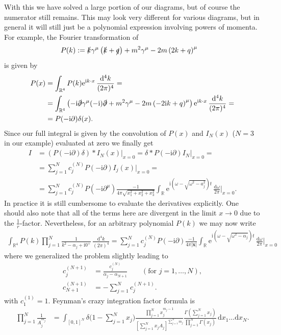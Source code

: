 \documentclass[english, parskip=full]{scrartcl}
\newcommand{\intx}{}
\newcommand{\intr}{}
\newcommand{\kla}{}
\newcommand{\klam}{}
\newcommand{\tecxt}{}
\renewcommand{\i}{\text{i}}
\newcommand{\e}{\text{e}}
\begin{document}
With this we have solved a large portion of our diagrams, but of course the numerator still remains.
This may look very different for various diagrams, but in general it will still just be a polynomial expression involving powers of momenta.
For example, the Fourier transformation of
\begin{align}
P(k) &:= \slashed{k} \gamma^\mu \kla\left( \slashed{k} + \slashed{q} \right) + m^2\gamma^\mu - 2m \kla\left( 2k + q \right)^\mu 
\end{align}
is given by
\begin{align}
P(x) &= \intr\int_{\mathbb{R}^{4}} P(k)\e^{\i k\cdot x} \, \frac{\mathrm{d}^{4}k}{(2\pi)^4} = \\
&= \int_{\mathbb{R}^{4}} \kla\left( -\i\slashed{\partial} \gamma^\mu (-\i) \slashed{\partial} + m^2 \gamma^\mu - 2m \kla\left( -2\i k + q \right)^\mu  \right) \e^{\i k\cdot x} \, \frac{\mathrm{d}^{4}k}{(2\pi)^4} = \\
&= P(-\i\partial) \delta(x).
\end{align}
Since our full integral is given by the convolution of $P(x)$ and $I_N(x)$ ($N=3$ in our example) evaluated at zero we finally get
\begin{align}
I &= \kla\left( P(-\i\partial) \delta \right) \ast I_N(x) \Big\vert_{x=0} = \delta \ast P(-\i\partial) I_N \Big\vert_{x=0} = \\
&= \sum_{j=1}^N c_j^{(N)} P(-\i\partial) I_j(x) \Big\vert_{x=0} = \\
&= \sum_{j=1}^N c_j^{(N)} P(-\i\partial^\mu) \frac{-1}{4\pi \sqrt{x_1^2 + x_2^2 + x_3^2}} \intr\int_{\mathbb{R}^{ }} \e^{\i \kla\left( \omega - \sqrt{\omega^2 - a_j^2} \right) t} \, \frac{\mathrm{d}\omega}{2\pi} \Big\vert_{x=0}.
\end{align}
In practice it is still cumbersome to evaluate the derivatives explicitly. 
One should also note that all of the terms here are divergent in the limit $x\rightarrow 0$ due to the $\frac{1}{r}$-factor.
Nevertheless, for an arbitrary polynomial $P(k)$ we may now write
\begin{align}
\intr\int_{\mathbb{R}^{4}} P(k) \prod_{j=1}^N \frac{1}{k^2 - \alpha_j + \i 0^+} \, \frac{\mathrm{d}^{4}k}{(2\pi)^4} = \sum_{j=1}^N c_j^{(N)} P(-\i\partial) \frac{-1}{4\pi |\textbf{x}|} \int_{\mathbb{R}^{ }} \e^{\i \kla\left( \omega - \sqrt{\omega^2 - \alpha_j} \right) t} \, \frac{\mathrm{d}\omega}{2\pi} \bigg\vert_{x=0}
\end{align}
where we generalized the problem slightly leading to 
\begin{align}
c_j^{(N+1)} &= \frac{c_j^{(N)}}{\alpha_j - \alpha_{N+1}} \qquad (\tecxt\text{for } j=1,\dots,N),\\
c_{N+1}^{(N+1)} &= - \sum_{j=1}^N c_j^{(N+1)}.
\end{align}
with $c^{(1)}_1 = 1$.
Feynman's crazy integration factor formula is
\begin{align}
\prod_{j=1}^N \frac{1}{A_j^{m_j}} &= \intx\int_{[0,1]^N} \delta \bigg( 1 - \sum_{j=1}^N x_j \bigg) \frac{\prod_{j=1}^N x_j^{m_j - 1} }{\klam\left[ \sum_{j=1}^N x_jA_j \right]^{\sum_{j=1}^N m_j}} \frac{\Gamma\kla\left( \sum_{j=1}^N x_j \right)}{\prod_{j=1}^N \Gamma \kla\left( x_j \right)} \, \mathrm{d}x_1 \dots \mathrm{d}x_N.
\end{align}

\end{document}
